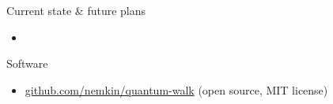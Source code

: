 \documentclass[aspectratio=169]{beamer}
\begin{document}
\begin{frame}{Current state \& future plans}
\begin{itemize}
    \item 
\end{itemize}
    
\end{frame}

\begin{frame}{Software}
\begin{itemize}
    \item \url{github.com/nemkin/quantum-walk} (open source, MIT license)
\end{itemize}
\end{frame}
\end{document}
